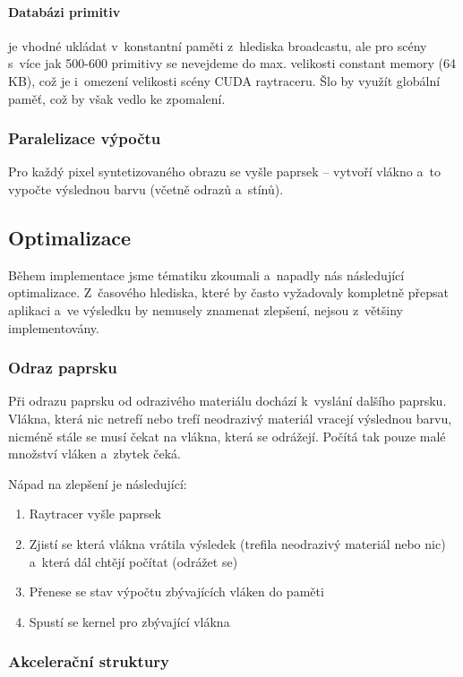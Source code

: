 \documentclass[12pt,a4paper,titlepage,final]{report}
\begin{document}
\paragraph{Databázi primitiv} je vhodné ukládat v~konstantní paměti z~hlediska broadcastu, ale pro scény s~více jak 500-600 primitivy se nevejdeme do max. velikosti constant memory (64 KB), což je i~omezení velikosti scény CUDA raytraceru. Šlo by využít globální paměť, což by však vedlo ke zpomalení.

\subsubsection{Paralelizace výpočtu}

Pro každý pixel syntetizovaného obrazu se vyšle paprsek -- vytvoří vlákno a~to vypočte výslednou barvu (včetně odrazů a~stínů).

\subsection{Optimalizace}

Během implementace jsme tématiku zkoumali a~napadly nás následující optimalizace. Z~časového hlediska, které by často vyžadovaly kompletně přepsat aplikaci a~ve výsledku by nemusely znamenat zlepšení, nejsou z~většiny implementovány.

\subsubsection{Odraz paprsku} 

Při odrazu paprsku od odrazivého materiálu dochází k~vyslání dalšího paprsku. Vlákna, která nic netrefí nebo trefí neodrazivý materiál vracejí výslednou barvu, nicméně stále se musí čekat na vlákna, která se odrážejí. Počítá tak pouze malé množství vláken a~zbytek čeká. 

Nápad na zlepšení je následující:
\begin{enumerate}
	\item Raytracer vyšle paprsek
	\item Zjistí se která vlákna vrátila výsledek (trefila neodrazivý materiál nebo nic) a~která dál chtějí počítat (odrážet se)
	\item Přenese se stav výpočtu zbývajících vláken do paměti
	\item Spustí se kernel pro zbývající vlákna 
\end{enumerate}

\subsubsection{Akcelerační struktury}
\end{document}
